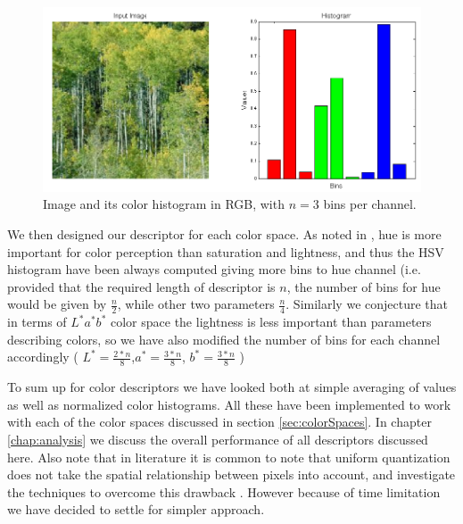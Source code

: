 \documentclass{report}
\begin{document}
\begin{figure}[hbtp]
\centering
\includegraphics[scale=0.3]{graphics/colorHistogram.png}
\caption{Image and its color histogram in RGB, with $n = 3$ bins per channel. }
\label{fig:colSpaces}
\end{figure}

We then designed our descriptor for each color space. As noted in \cite{HSV_non_uniform}, hue is more important for color perception than saturation and lightness, and thus the HSV histogram have been always computed giving more bins to hue channel (i.e. provided that the required length of descriptor is $n$, the number of bins for hue would be given by $\frac{n}{2}$, while other two parameters $\frac{n}{4}$. Similarly we conjecture that in terms of $L^*a^*b^*$ color space the lightness is less important than parameters describing colors, so we have also modified the number of bins for each channel accordingly ( $L^* = \frac{2*n}{8}$,$ a^* = \frac{3*n}{8}$, $b^* = \frac{3*n}{8}$ )

To sum up for color descriptors we have looked both at simple averaging of values as well as normalized color histograms. All these have been implemented to work with each of the color spaces discussed in section \ref{sec:colorSpaces}. In chapter \ref{chap:analysis} we discuss the overall performance of all descriptors discussed here. Also note that in literature it is common to note that uniform quantization does not take the spatial relationship between pixels into account, and investigate the techniques to overcome this drawback \cite{GaussQunatization}. However because of time limitation we have decided to settle for simpler approach.
\end{document}
